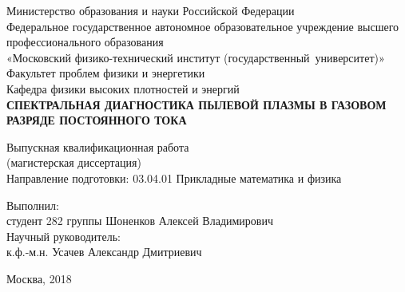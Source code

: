 \begin{center}
    Министерство образования и науки Российской Федерации\\
    Федеральное государственное автономное образовательное учреждение высшего профессионального образования\\
    «Московский физико-технический институт \pt(государственный~университет)»\\[10mm]

    Факультет проблем физики и энергетики\\[5mm]
    Кафедра физики высоких плотностей и энергий\\[15mm]

    \textbf{
        СПЕКТРАЛЬНАЯ ДИАГНОСТИКА ПЫЛЕВОЙ ПЛАЗМЫ В ГАЗОВОМ РАЗРЯДЕ ПОСТОЯННОГО ТОКА\\[10mm]
    }

    Выпускная квалификационная работа\\
    (магистерская диссертация)\\[5mm]

Направление подготовки: 03.04.01 Прикладные математика и физика\\[15mm]
\end{center}
Выполнил:\\
студент 282 группы \uline{\hfill} Шоненков Алексей Владимирович\\[10mm]
Научный руководитель:\\
к.ф.-м.н. \uline{\hfill} Усачев Александр Дмитриевич\\[10mm]
\vfill

\begin{center}
    Москва, 2018
\end{center}

\thispagestyle{empty}
